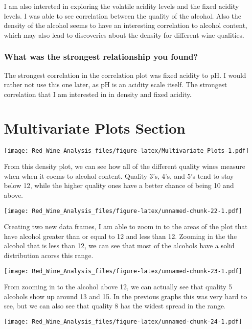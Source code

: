 \documentclass[]{article}
\begin{document}
I am also intereted in exploring the volatile acidity levels and the
fixed acidity levels. I was able to see correlation between the quality
of the alcohol. Also the density of the alcohol seems to have an
interesting correlation to alcohol content, which may also lead to
discoveries about the density for different wine qualities.

\hypertarget{what-was-the-strongest-relationship-you-found}{%
\subsubsection{What was the strongest relationship you
found?}\label{what-was-the-strongest-relationship-you-found}}

The strongest correlation in the correlation plot was fixed acidity to
pH. I would rather not use this one later, as pH is an acidity scale
itself. The strongest correlation that I am interested in in density and
fixed acidity.

\hypertarget{multivariate-plots-section}{%
\section{Multivariate Plots Section}\label{multivariate-plots-section}}

\texttt{[image: Red\_Wine\_Analysis\_files/figure-latex/Multivariate\_Plots-1.pdf]}

From this density plot, we can see how all of the different quality
wines measure when when it coems to alcohol content. Quality 3's, 4's,
and 5's tend to stay below 12, while the higher quality ones have a
better chance of being 10 and above.

\texttt{[image: Red\_Wine\_Analysis\_files/figure-latex/unnamed-chunk-22-1.pdf]}

Creating two new data frames, I am able to zoom in to the areas of the
plot that have alcohol greater than or equal to 12 and less than 12.
Zooming in the the alcohol that is less than 12, we can see that most of
the alcohols have a solid distribution acorss this range.

\texttt{[image: Red\_Wine\_Analysis\_files/figure-latex/unnamed-chunk-23-1.pdf]}

From zooming in to the alcohol above 12, we can actually see that
quality 5 alcohols show up around 13 and 15. In the previous graphs this
was very hard to see, but we can also see that quality 8 has the widest
spread in the range.

\texttt{[image: Red\_Wine\_Analysis\_files/figure-latex/unnamed-chunk-24-1.pdf]}
\end{document}
